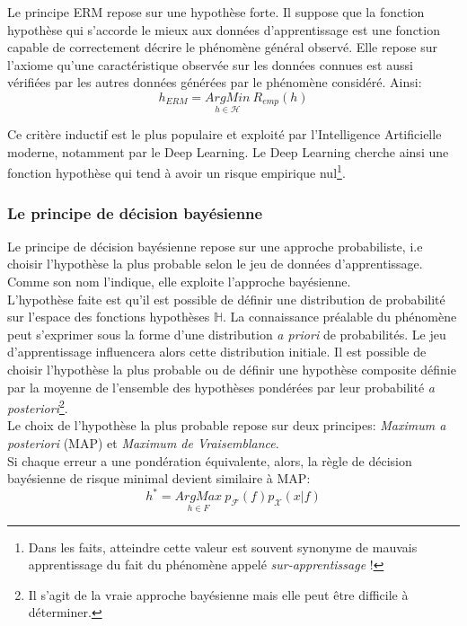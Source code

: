 \noindent Le principe ERM repose sur une hypothèse forte. Il suppose que la fonction hypothèse qui s'accorde le mieux aux données d'apprentissage est une fonction capable de correctement décrire le phénomène général observé. Elle repose sur l'axiome qu'une caractéristique observée sur les données connues est aussi vérifiées par les autres données générées par le phénomène considéré. Ainsi:
$$h_{ERM}=\underset{h \in \mathcal{H}}{ArgMin} \ R_{emp}(h)$$

\noindent Ce critère inductif est le plus populaire et exploité par l'Intelligence Artificielle moderne, notamment par le Deep Learning. Le Deep Learning cherche ainsi une fonction hypothèse qui tend à avoir un risque empirique nul\footnote{Dans les faits, atteindre cette valeur est souvent synonyme de mauvais apprentissage du fait du phénomène appelé \textit{sur-apprentissage} !}.

\subsubsection{Le principe de décision bayésienne}
\noindent Le principe de décision bayésienne repose sur une approche probabiliste, i.e choisir l'hypothèse la plus probable selon le jeu de données d'apprentissage. Comme son nom l'indique, elle exploite l'approche bayésienne.\\

\noindent L'hypothèse faite est qu'il est possible de définir une distribution de probabilité sur l'espace des fonctions hypothèses $\mathbb{H}$. La connaissance préalable du phénomène peut s'exprimer sous la forme d'une distribution \textit{a priori} de probabilités. Le jeu d'apprentissage influencera alors cette distribution initiale. Il est possible de choisir l'hypothèse la plus probable ou de définir une hypothèse composite définie par la moyenne de l'ensemble des hypothèses pondérées par leur probabilité \textit{a posteriori}\footnote{Il s'agit de la vraie approche bayésienne mais elle peut être difficile à déterminer.}.\\

\noindent Le choix de l'hypothèse la plus probable repose sur deux principes: \textit{Maximum a posteriori} (MAP) et \textit{Maximum de Vraisemblance}.\\

\noindent Si chaque erreur a une pondération équivalente, alors, la règle de décision bayésienne de risque minimal devient similaire à MAP:
$$h^*=\underset{h \in F}{ArgMax} \ p_{\mathcal{F}}(f)p_{\mathcal{X}}(x|f)$$

